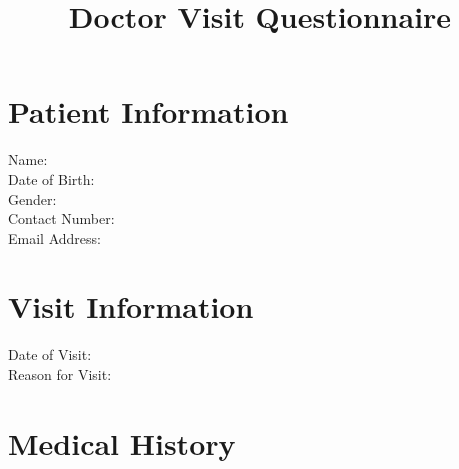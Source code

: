 \documentclass{article}
\title{Doctor Visit Questionnaire}
\author{}
\date{}
\begin{document}
\maketitle

\section*{Patient Information}

\begin{tabbing}
Name: \hspace{5cm} \= \underline{\hspace{10cm}} \\
Date of Birth: \> \underline{\hspace{10cm}} \\
Gender: \> \underline{\hspace{10cm}} \\
Contact Number: \> \underline{\hspace{10cm}} \\
Email Address: \> \underline{\hspace{10cm}} \\
\end{tabbing}

\section*{Visit Information}

\begin{tabbing}
Date of Visit: \hspace{5cm} \= \underline{\hspace{10cm}} \\
Reason for Visit: \> \underline{\hspace{25cm}} \\
\end{tabbing}

\section*{Medical History}
\end{document}
